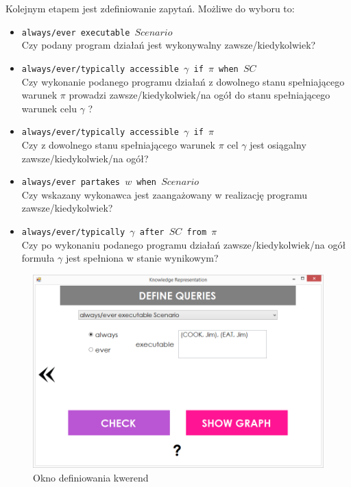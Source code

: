 \documentclass{article}
\begin{document}
Kolejnym etapem jest zdefiniowanie zapytań. Możliwe do wyboru to:
\begin{itemize}
\item {\large\texttt{always/ever executable $Scenario$}} \\
Czy podany program działań jest wykonywalny zawsze/kiedykolwiek?
\item {\large\texttt{always/ever/typically accessible $\gamma$ if $\pi$ when $SC$}}\\
Czy wykonanie podanego programu działań z dowolnego stanu spełniającego warunek $\pi$ prowadzi zawsze/kiedykolwiek/na ogół do stanu spełniającego warunek celu $\gamma$ ?
\item {\large\texttt{always/ever/typically accessible $\gamma$ if $\pi$}}\\
Czy z dowolnego stanu spełniającego warunek $\pi$ cel $\gamma$ jest osiągalny zawsze/kiedykolwiek/na ogół?
\item {\large\texttt{always/ever partakes $w$ when $Scenario$}} \\
Czy wskazany wykonawca jest zaangażowany w realizację programu zawsze/kiedykolwiek?
\item {\large\texttt{always/ever/typically $\gamma$ after $SC$ from $\pi$}}\\
Czy po wykonaniu podanego programu działań zawsze/kiedykolwiek/na ogół formuła $\gamma$ jest spełniona w stanie wynikowym?
\end{itemize}





\newpage

\begin{figure}[H]
\centering
\includegraphics[scale=0.4]{12}
\caption{Okno definiowania kwerend}
\end{figure}
\end{document}
